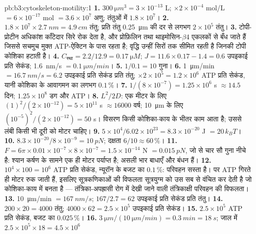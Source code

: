 \begin{solution}{pb:b3:cytoskeleton-motility:1}
\textbf{1.} $\qty{300}{\micro m^3} = 3\times 10^{-13}$ L; $\times
2\times 10^{-4}$ mol/L $= 6\times 10^{-17}$ mol $= 3.6\times 10^{7}$
अणु; तंतुओं में $1.8\times 10^{7}$।
\textbf{2.} $1.8\times 10^{7}\times \qty{2.7}{nm} = \qty{4.9}{cm}$
तंतु; प्रति तंतु \qty{0.25}{\micro m} की दर से लगभग $2\times 10^{5}$
तंतु।
\textbf{3.} टोपी-प्रोटीन अधिकांश काँटेदार सिरे रोक देता है, और प्रोफ़िलिन
तथा थाइमोसिन-$\beta$4 एकलकों से बँध जाते हैं जिससे सचमुच मुक्त
ATP-ऐक्टिन  के पास रहता है; वृद्धि उन्हीं सिरों तक
सीमित रहती है जिनकी टोपी कोशिका हटाती है।
\textbf{4.} $C_{\text{स्था}} = 2.2/12.9 = \qty{0.17}{\micro M}$; $J = 11.6
\times 0.17 - 1.4 = 0.6$ उपइकाई प्रति सेकंड; \qty{1.6}{nm/s} $=
\qty{0.1}{\micro m/min}$।
\textbf{5.} $1/0.1 = 10$ गुना।
\textbf{6.} \qty{1}{\micro m/min} $= \qty{16.7}{nm/s} = 6.2$ उपइकाई
प्रति सेकंड प्रति तंतु; $\times 2\times 10^{5} = 1.2\times 10^{6}$ ATP
प्रति सेकंड, यानी कोशिका के आवागमन का लगभग $0.1\,\%$।
\textbf{7.} $1/(8\times 10^{-7}) = 1.25\times 10^{6}$ s $\approx 14.5$
दिन; $1.25\times 10^{8}$ डग और ATP।
\textbf{8.} $L^{2}/2D$: एक मीटर के लिए $(1)^{2}/(2\times 10^{-12}) = 5\times 10^{11}$ s
$\approx \num{16000}$ वर्ष; \qty{10}{\micro m} के लिए $(10^{-5})^{2}/(2\times
10^{-12}) = 50$ s। विसरण किसी कोशिका-काय के भीतर काम आता
है; उससे लंबी किसी भी दूरी को मोटर चाहिए।
\textbf{9.} $5\times 10^{4}/6.02\times 10^{23} = 8.3\times 10^{-20}$ J
$= 20\,k_{B}T$।
\textbf{10.} $8.3\times 10^{-20}/8\times 10^{-9} = \qty{10}{pN}$;
दक्षता $6/10 \approx 60\,\%$।
\textbf{11.} $F = 6\pi\times 0.01\times 10^{-7}\times 8\times 10^{-7} =
1.5\times 10^{-14}$ N $= \qty{0.015}{pN}$, जो  से चार सौ गुना
नीचे है: श्यान कर्षण के सामने एक ही मोटर पर्याप्त है; असली भार बाधाएँ
और बंधन हैं।
\textbf{12.} $10^{4}\times 100 = 10^{6}$ ATP प्रति सेकंड, न्यूरॉन के
बजट का $0.1\,\%$: परिवहन सस्ता है। पर ATP गिरते ही मोटर रुक जाती हैं,
इसलिए सूत्रकणिकाओं की विफलता सूत्रयुग्म को उस सब से वंचित कर देती है
जो कोशिका-काय में बनता है --- तंत्रिका-अपह्रासी रोग में देखी जाने वाली
तंत्रिकाक्षी परिवहन की विफलता।
\textbf{13.} \qty{10}{\micro m/min} $= \qty{167}{nm/s}$; $167/2.7 = 62$
उपइकाई प्रति सेकंड प्रति तंतु।
\textbf{14.} $200\times 20 = 4000$ तंतु; $4000\times 62 = 2.5\times
10^{5}$ उपइकाई प्रति सेकंड।
\textbf{15.} $2.5\times 10^{5}$ ATP प्रति सेकंड, बजट का $0.025\,\%$।
\textbf{16.} $\qty{3}{\micro m}/(\qty{10}{\micro m/min}) = \qty{0.3}{min}
= \qty{18}{s}$; जाल में $2.5\times 10^{5}\times 18 = 4.5\times 10^{6}$

\end{solution}

